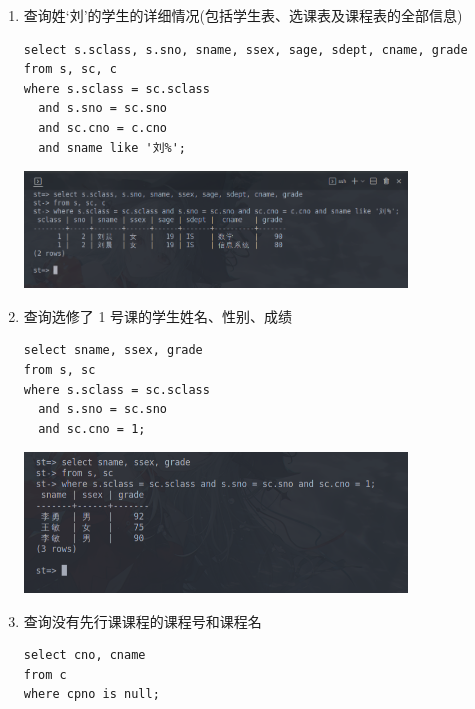 \documentclass[hyperref,UTF8,12pt,a4paper]{ctexart}
\begin{document}
\begin{enumerate}
\item 查询姓‘刘’的学生的详细情况(包括学生表、选课表及课程表的全部信息)

\begin{verbatim}
select s.sclass, s.sno, sname, ssex, sage, sdept, cname, grade
from s, sc, c
where s.sclass = sc.sclass
  and s.sno = sc.sno
  and sc.cno = c.cno
  and sname like '刘%';
\end{verbatim}

\begin{center}
\includegraphics[width=0.8\textwidth]{11.png}
\end{center}

\item 查询选修了 1 号课的学生姓名、性别、成绩

\begin{verbatim}
select sname, ssex, grade
from s, sc
where s.sclass = sc.sclass
  and s.sno = sc.sno
  and sc.cno = 1;
\end{verbatim}

\begin{center}
\includegraphics[width=0.8\textwidth]{12.png}
\end{center}

\item 查询没有先行课课程的课程号和课程名

\begin{verbatim}
select cno, cname
from c
where cpno is null;
\end{verbatim}


\end{enumerate}
\end{document}
